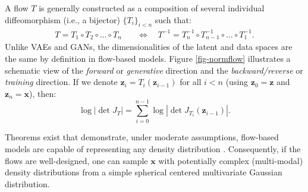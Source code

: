 \documentclass[fleqn,usenatbib]{mnras}
\begin{document}

{\color{red}
A flow $T$ is generally constructed as a composition of several individual diffeomorphism (i.e., a bijector)  $\{T_i\}_{i<n}$ such that:
\begin{align}
T = T_1 \circ T_2 \circ \dots \circ T_n & \quad \Leftrightarrow \quad 
T^{-1} = T_n^{-1} \circ T_{n-1}^{-1} \circ \dots \circ T_1^{-1}.
\end{align}
Unlike VAEs and GANs, the dimensionalities of the latent and data spaces are the same by definition in flow-based models.
Figure \ref{fig-normflow} illustrates a schematic view of the \textit{forward} or \textit{generative} direction and the \textit{backward/reverse} or \textit{training} direction. If we denote $\bm{z}_i = T_i(\bm{z}_{i-1})$ for all $i < n$ (using $\bm{z}_0 = \bm{z}$ and $\bm{z}_n = \bm{x}$), then:
\begin{equation}
\log |\det J_T| = \sum_{i=0}^{n-1} \log |\det J_{T_i}(\bm{z}_{i-1})|.
\label{eq-flow-jacob}
\end{equation}
}

Theorems exist that demonstrate, under moderate assumptions, flow-based models are capable of representing any density distribution \citep{Bogachev2005, huang2019solving}. Consequently, if the flows are well-designed, one can sample $\bm{x}$ with potentially complex (multi-modal) density distributions from a simple spherical centered multivariate Gaussian distribution.
\end{document}
